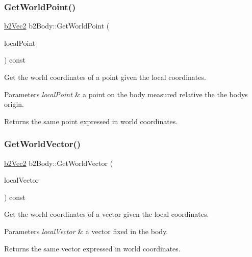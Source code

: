 \subsubsection{\texorpdfstring{Get\+World\+Point()}{GetWorldPoint()}\hspace{0.1cm}{\footnotesize\ttfamily [2/2]}}
{\footnotesize\ttfamily \hyperlink{structb2Vec2}{b2\+Vec2} b2\+Body\+::\+Get\+World\+Point (\begin{DoxyParamCaption}\item[{const \hyperlink{structb2Vec2}{b2\+Vec2} \&}]{local\+Point }\end{DoxyParamCaption}) const}

Get the world coordinates of a point given the local coordinates. 
\begin{DoxyParams}{Parameters}
{\em local\+Point} & a point on the body measured relative the the body\textquotesingle{}s origin. \\
\hline
\end{DoxyParams}
\begin{DoxyReturn}{Returns}
the same point expressed in world coordinates. 
\end{DoxyReturn}
\mbox{\label{classb2Body_ae8c434785b2a730f7c385e708b345bb6}} 
\subsubsection{\texorpdfstring{Get\+World\+Vector()}{GetWorldVector()}\hspace{0.1cm}{\footnotesize\ttfamily [1/2]}}
{\footnotesize\ttfamily \hyperlink{structb2Vec2}{b2\+Vec2} b2\+Body\+::\+Get\+World\+Vector (\begin{DoxyParamCaption}\item[{const \hyperlink{structb2Vec2}{b2\+Vec2} \&}]{local\+Vector }\end{DoxyParamCaption}) const\hspace{0.3cm}{\ttfamily [inline]}}

Get the world coordinates of a vector given the local coordinates. 
\begin{DoxyParams}{Parameters}
{\em local\+Vector} & a vector fixed in the body. \\
\hline
\end{DoxyParams}
\begin{DoxyReturn}{Returns}
the same vector expressed in world coordinates. 
\end{DoxyReturn}
\mbox{\label{classb2Body_ae8c434785b2a730f7c385e708b345bb6}} 
